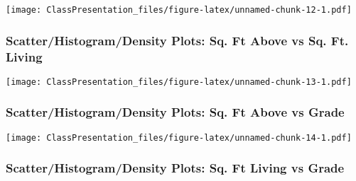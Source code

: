 \documentclass[]{article}
\newenvironment{Shaded}{\begin{snugshade}}{\end{snugshade}}
\newcommand{\DataTypeTok}[1]{\textcolor[rgb]{0.13,0.29,0.53}{#1}}
\newcommand{\KeywordTok}[1]{\textcolor[rgb]{0.13,0.29,0.53}{\textbf{#1}}}
\newcommand{\NormalTok}[1]{#1}
\newcommand{\OperatorTok}[1]{\textcolor[rgb]{0.81,0.36,0.00}{\textbf{#1}}}
\newcommand{\StringTok}[1]{\textcolor[rgb]{0.31,0.60,0.02}{#1}}
\begin{document}
\texttt{[image: ClassPresentation\_files/figure-latex/unnamed-chunk-12-1.pdf]}

\hypertarget{scatterhistogramdensity-plots-sq.-ft-above-vs-sq.-ft.-living}{%
\subsubsection{Scatter/Histogram/Density Plots: Sq. Ft Above vs Sq. Ft.
Living}\label{scatterhistogramdensity-plots-sq.-ft-above-vs-sq.-ft.-living}}

\begin{Shaded}
\end{Shaded}

\texttt{[image: ClassPresentation\_files/figure-latex/unnamed-chunk-13-1.pdf]}

\hypertarget{scatterhistogramdensity-plots-sq.-ft-above-vs-grade}{%
\subsubsection{Scatter/Histogram/Density Plots: Sq. Ft Above vs
Grade}\label{scatterhistogramdensity-plots-sq.-ft-above-vs-grade}}

\begin{Shaded}
\end{Shaded}

\texttt{[image: ClassPresentation\_files/figure-latex/unnamed-chunk-14-1.pdf]}

\hypertarget{scatterhistogramdensity-plots-sq.-ft-living-vs-grade}{%
\subsubsection{Scatter/Histogram/Density Plots: Sq. Ft Living vs
Grade}\label{scatterhistogramdensity-plots-sq.-ft-living-vs-grade}}
\end{document}
